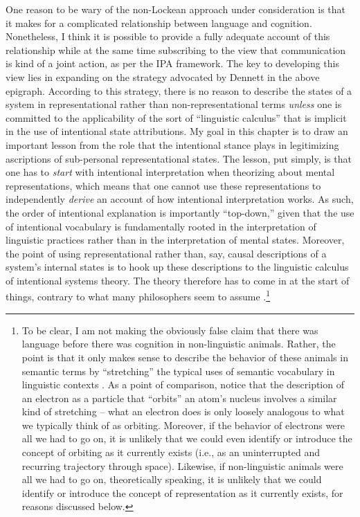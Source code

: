 One reason to be wary of the non-Lockean approach under consideration is that it makes for a complicated relationship between language and cognition. Nonetheless, I think it is possible to provide a fully adequate account of this relationship while at the same time subscribing to the view that communication is kind of a joint action, as per the IPA framework. The key to developing this view lies in expanding on the strategy advocated by Dennett in the above epigraph. According to this strategy, there is no reason to describe the states of a system in representational rather than non-representational terms \textit{unless} one is committed to the applicability of the sort of ``linguistic calculus'' that is implicit in the use of intentional state attributions. My goal in this chapter is to draw an important lesson from the role that the intentional stance plays in legitimizing ascriptions of sub-personal representational states. The lesson, put simply, is that one has to \textit{start} with intentional interpretation when theorizing about mental representations, which means that one cannot use these representations to independently \textit{derive} an account of how intentional interpretation works. As such, the order of intentional explanation is importantly ``top-down,'' given that the use of intentional vocabulary is fundamentally rooted in the interpretation of linguistic practices rather than in the interpretation of mental states. Moreover, the point of using representational rather than, say, causal descriptions of a system's internal states is to hook up these descriptions to the linguistic calculus of intentional systems theory. The theory therefore has to come in at the start of things, contrary to what many philosophers seem to assume \citep[e.g.,][]{Millikan:1989,Fodor:1998,Dretske:1986}.\footnote{To be clear, I am not making the obviously false claim that there was language before there was cognition in non-linguistic animals. Rather, the point is that it only makes sense to describe the behavior of these animals in semantic terms by ``stretching'' the typical uses of semantic vocabulary in linguistic contexts \citep[][p. 59]{Dennett:2010}. As a point of comparison, notice that the description of an electron as a particle that ``orbits'' an atom's nucleus involves a similar kind of stretching -- what an electron does is only loosely analogous to what we typically think of as orbiting. Moreover, if the behavior of electrons were all we had to go on, it is unlikely that we could even identify or introduce the concept of orbiting as it currently exists (i.e., as an uninterrupted and recurring trajectory through space). Likewise, if non-linguistic animals were all we had to go on, theoretically speaking, it is unlikely that we could identify or introduce the concept of representation as it currently exists, for reasons discussed below.} 

